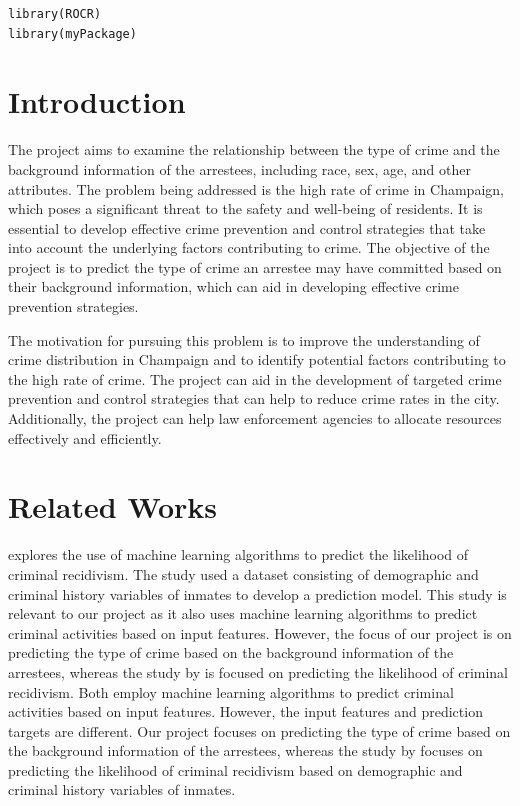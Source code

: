 \documentclass[
  article]{jss}
\begin{document}
\begin{verbatim}
library(ROCR)
library(myPackage)
\end{verbatim}

\hypertarget{introduction}{%
\section{Introduction}\label{introduction}}

The project aims to examine the relationship between the type of crime
and the background information of the arrestees, including race, sex,
age, and other attributes. The problem being addressed is the high rate
of crime in Champaign, which poses a significant threat to the safety
and well-being of residents. It is essential to develop effective crime
prevention and control strategies that take into account the underlying
factors contributing to crime. The objective of the project is to
predict the type of crime an arrestee may have committed based on their
background information, which can aid in developing effective crime
prevention strategies.

The motivation for pursuing this problem is to improve the understanding
of crime distribution in Champaign and to identify potential factors
contributing to the high rate of crime. The project can aid in the
development of targeted crime prevention and control strategies that can
help to reduce crime rates in the city. Additionally, the project can
help law enforcement agencies to allocate resources effectively and
efficiently.

\hypertarget{related-works}{%
\section{Related Works}\label{related-works}}

\citet{Travaini2022} explores the use of machine learning algorithms to
predict the likelihood of criminal recidivism. The study used a dataset
consisting of demographic and criminal history variables of inmates to
develop a prediction model. This study is relevant to our project as it
also uses machine learning algorithms to predict criminal activities
based on input features. However, the focus of our project is on
predicting the type of crime based on the background information of the
arrestees, whereas the study by \citet{Travaini2022} is focused on
predicting the likelihood of criminal recidivism. Both employ machine
learning algorithms to predict criminal activities based on input
features. However, the input features and prediction targets are
different. Our project focuses on predicting the type of crime based on
the background information of the arrestees, whereas the study by
\citet{Travaini2022} focuses on predicting the likelihood of criminal
recidivism based on demographic and criminal history variables of
inmates.
\end{document}
